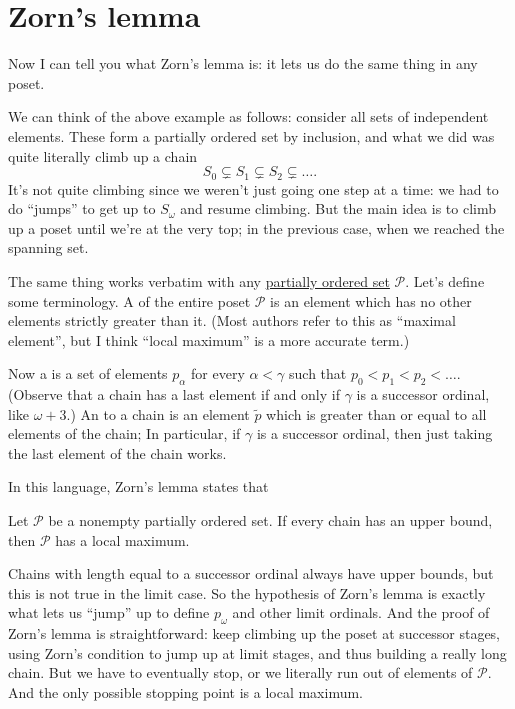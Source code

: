 \section{Zorn's lemma}
Now I can tell you what Zorn's lemma is:
it lets us do the same thing in any poset.

We can think of the above example as follows:
consider all sets of independent elements.
These form a partially ordered set by inclusion, and what we did
was quite literally climb up a chain
\[ S_0 \subsetneq S_1 \subsetneq S_2 \subsetneq \dots. \]
It's not quite climbing since we weren't just going one step at a time:
we had to do ``jumps'' to get up to $S_\omega$ and resume climbing.
But the main idea is to climb up a poset until we're at the very top;
in the previous case, when we reached the spanning set.

The same thing works verbatim with any \href{https://en.wikipedia.org/wiki/Partially_ordered_set}{partially ordered set}
$\mathcal P$.
Let's define some terminology.
A  of the entire poset $\mathcal P$ is an element
which has no other elements strictly greater than it.
(Most authors refer to this as ``maximal element'', but I think
``local maximum'' is a more accurate term.)

Now a  is a set of elements $p_\alpha$ for every $\alpha < \gamma$
such that $p_0 < p_1 < p_2 < \dots$.
(Observe that a chain has a last element if and only if $\gamma$ is a successor ordinal, like $\omega+3$.)
An  to a chain is an element $\tilde p$ which is greater than or equal
to all elements of the chain;
In particular, if $\gamma$ is a successor ordinal, then just taking the last element of the chain works.

In this language, Zorn's lemma states that
\begin{theorem}
	Let $\mathcal P$ be a nonempty partially ordered set.
	If every chain has an upper bound,
	then $\mathcal P$ has a local maximum.
\end{theorem}

Chains with length equal to a successor ordinal always have upper bounds,
but this is not true in the limit case.
So the hypothesis of Zorn's lemma is exactly what
lets us ``jump'' up to define $p_\omega$ and other limit ordinals.
And the proof of Zorn's lemma is straightforward: keep climbing up the poset at successor stages,
using Zorn's condition to jump up at limit stages, and thus building a really long chain.
But we have to eventually stop, or we literally run out of elements of $\mathcal P$.
And the only possible stopping point is a local maximum.

